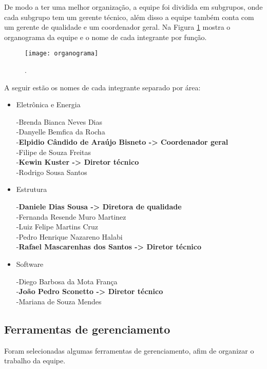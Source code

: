  De modo a ter uma melhor organização, a equipe foi dividida em subgrupos, onde cada subgrupo tem um gerente técnico, além disso a equipe também conta com um gerente de qualidade e um coordenador geral. Na Figura \ref{fig:organograma} mostra o organograma da equipe e o nome de cada integrante por função.
 
\begin{figure}[h]
\centering
\texttt{[image: organograma]}
\caption{.}\label{fig:organograma}
\end{figure} 

A seguir estão os nomes de cada integrante separado por área:

\begin{itemize}
\item Eletrônica e Energia

-Brenda Bianca Neves Dias\\
-Danyelle Bemfica da Rocha\\
-\textbf{Elpidio Cândido de Araújo Bisneto -> Coordenador geral}\\
-Filipe de Souza Freitas\\
-\textbf{Kewin Kuster -> Diretor técnico}\\
-Rodrigo Sousa Santos

\item Estrutura

-\textbf{Daniele Dias Sousa -> Diretora de qualidade}\\
-Fernanda Resende Muro Martinez\\
-Luiz Felipe Martins Cruz\\
-Pedro Henrique Nazareno Halabi\\
-\textbf{Rafael Mascarenhas dos Santos -> Diretor técnico}

\item Software

-Diego Barbosa da Mota França\\
-\textbf{João Pedro Sconetto -> Diretor técnico}\\
-Mariana de Souza Mendes 


\end{itemize}

\subsection{Ferramentas de gerenciamento}

Foram selecionadas algumas ferramentas de gerenciamento, afim de organizar o trabalho da equipe.


